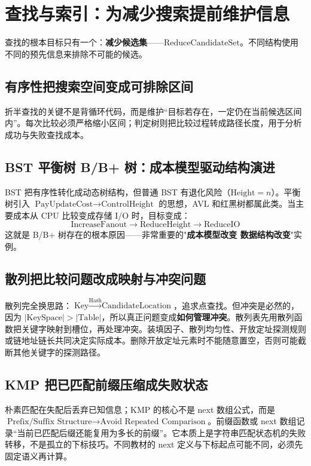 \documentclass[11pt,a4paper,openany]{ctexbook}
\newcommand{\key}[1]{\textbf{\color{deep}#1}}
\begin{document}
\section{查找与索引：为减少搜索提前维护信息}

查找的根本目标只有一个：\key{减少候选集}——$\text{ReduceCandidateSet}$。不同结构使用不同的预先信息来排除不可能的候选。

\subsection{有序性把搜索空间变成可排除区间}
折半查找的关键不是背循环代码，而是维护“目标若存在，一定仍在当前候选区间内”。每次比较必须严格缩小区间；判定树则把比较过程转成路径长度，用于分析成功与失败查找成本。

\subsection{BST \textrightarrow{} 平衡树 \textrightarrow{} B/B+ 树：成本模型驱动结构演进}
BST 把有序性转化成动态树结构，但普通 BST 有退化风险（$\text{Height}=n$）。平衡树引入 $\text{PayUpdateCost}\rightarrow\text{ControlHeight}$ 的思想，AVL 和红黑树都属此类。当主要成本从 CPU 比较变成存储 I/O 时，目标变成：
\[
\boxed{\text{IncreaseFanout}\rightarrow\text{ReduceHeight}\rightarrow\text{ReduceIO}}
\]
这就是 B/B+ 树存在的根本原因——非常重要的"\key{成本模型改变 \textrightarrow{} 数据结构改变}"实例。

\subsection{散列把比较问题改成映射与冲突问题}
散列完全换思路：$\text{Key}\xrightarrow{\text{Hash}}\text{CandidateLocation}$，追求点查找。但冲突是必然的，因为 $|\text{KeySpace}|>|\text{Table}|$，所以真正问题变成\key{如何管理冲突}。散列表先用散列函数把关键字映射到槽位，再处理冲突。装填因子、散列均匀性、开放定址探测规则或链地址链长共同决定实际成本。删除开放定址元素时不能随意置空，否则可能截断其他关键字的探测路径。

\subsection{KMP 把已匹配前缀压缩成失败状态}
朴素匹配在失配后丢弃已知信息；KMP 的核心不是 next 数组公式，而是 $\text{Prefix/Suffix Structure}\rightarrow\text{Avoid Repeated Comparison}$。前缀函数或 next 数组记录“当前已匹配后缀还能复用为多长的前缀”。它本质上是字符串匹配状态机的失败转移，不是孤立的下标技巧。不同教材的 next 定义与下标起点可能不同，必须先固定语义再计算。
\end{document}
